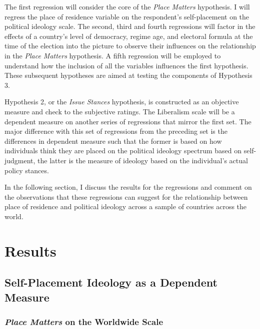 \documentclass[12pt, titlepage]{article}
\newcommand\e{\emph}
\begin{document}
The first regression will consider the core of the \e{Place Matters} hypothesis. I will regress the place of residence variable on the respondent's self-placement on the political ideology scale. The second, third and fourth regressions will factor in the effects of a country's level of democracy, regime age, and electoral formula at the time of the election into the picture to observe their influences on the relationship in the \e{Place Matters} hypothesis. A fifth regression will be employed to understand how the inclusion of all the variables influences the first hypothesis. These subsequent hypotheses are aimed at testing the components of Hypothesis 3.

Hypothesis 2, or the \e{Issue Stances} hypothesis, is constructed as an objective measure and check to the subjective ratings. The Liberalism scale will be a dependent measure on another series of regressions that mirror the first set. The major difference with this set of regressions from the preceding set is the differences in dependent measure such that the former is based on how individuals think they are placed on the political ideology spectrum based on self-judgment, the latter is the measure of ideology based on the individual's actual policy stances.

In the following section, I discuss the results for the regressions and comment on the observations that these regressions can suggest for the relationship between place of residence and political ideology across a sample of countries across the world.

\section{Results}

\subsection{Self-Placement Ideology as a Dependent Measure}

\subsubsection{\e{Place Matters} on the Worldwide Scale}
\end{document}
